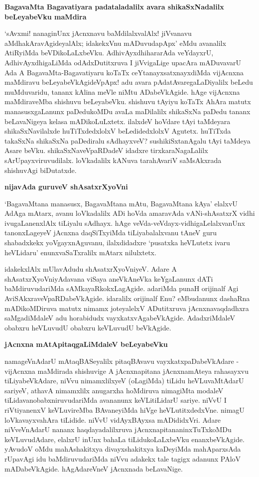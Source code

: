 {\bigskip
\noindent
{\large\bf BagavaMta Bagavatiyara padataladalilx avara shikaSxNadalilx beLeyabeVku maMdira}}\label{page67}
\medskip

\noindent
`sAvxmi! nanaginUnx jAcnxnavu baMdilalxvalAlx! jiVvanavu aMdhakAravAgideyalAlx; idakekxVnu mADuvu\-dapApx' eMdu avanalilx AtiRyiMda beVDikoLaLxbeVku. AdhivAyxdhihararAda veYdayxrU, AdhivAyxdhi\-gaLiMda odAdxDu\-titxruva I jiVvigaLige upacAra mADuvavarU Ada A BagavaMta-Bagavatiyaru koTaTx ceYtanayx\-satxnayxdiMda vijAcnxna maMdiravu beLeyabeVkAgideVpApx! adu avara pAdatAvaregaLaDiyalilx beLedu muMdu\-varidu, tananx kAlina meVle niMtu ADabeVkAgide. hAge vijAcnxna maMdiraveMba shishuvu beLeyabeVku. shishuvu tAyiyu koTaTx AhAra matutx manasusxgaLanunx paDedukoMDu avaLa maDilalilx shikaSxNa paDedu tananx beLa\-vaNigeya kelasa mADikoLuLxtetx. ilalxdeV hoVdare tAyi taMdeyara shikaSxNavilalxde huTiTxdedxlolxV beLedi\-dedxlolxV Agutetx. huTiTxda takaSxNa shikaSxNa paDediralu sAdhayxveV? sushikiSxtanAgalu tAyi taMdeya Asare beVku. shikaSxNaveVpaRDadeV idadxre tirxkaraNagaLalilx sArUpayxviruvudilalx. loVkadalilx kANuva tarahAvariV saMsAkxrada shishuvAgi biDutatxde.

{\bigskip
\noindent
{\large\bf nijavAda guruveV shAsatxrXyoVni}}\label{page68}
\medskip

\noindent
`BagavaMtana manasusx, BagavaMtana mAtu, BagavaMtana kAya' elalxvU AdAga mAtarx, avanu loVka\-dalilx ADi hoVda amaravAda vANi-shAsatxrX vidhi ivugaLanenxlAlx tiLi\-yalu sAdhayx. hAge veVda-veVdayx-vidhi\-gaLelalxvanUnx tanonxLageyeV jAcnxna daqSiTx\-yiMda tiLiyabalalxvanu tAneV guru shabadxkekx yoVgayxnAguvanu, ilalxdidadxre `pusatxka heVLutetx ivaru heVLidaru' enunxvaSaTxralilx mAtarx nilulxtetx.

idakekxlAlx mUlavAdudu shAsatxrXyoVniyeV. Adare A shAsatxrXyoVni\-yAdavana viSaya aneVkAneVka keYga\-Lanunx dATi baMdiruvudariMda sAMkayaRkokxLagAgide. adariMda punaH orijinalf Agi AviSAkxra\-veVpaRDabeVkAgide. idaralilx orijinalf Enu? eMbudanunx dashaRna mADikoMDiruva matutx nimamx joteyalelxV ADu\-titxruva jAcnxnavaqdadhxra saMgadiMdaleV adu horabidudx vayxkatxvAgabeVkAgide. Adadx\-riMdaleV obabxru heVLuvudU obabxru keVLuvudU beVkAgide.

{\bigskip
\noindent
{\large\bf jAcnxna mAtApitaqgaLiMdaleV beLeyabeVku}}\label{page79}
\medskip

\noindent
namageVnAdarU mAtaqBASeyalilx pitaqBAvavu vayxkatxpaDabeVkAdare - vijAcnxna maMdirada shishuvige A jAcnxna\-pitana jAcnxnamAteya rahasayxvu tiLiyabeVkAdare, niVvu nimamxlilxyeV (oLagiMda) tiLidu heVLu\-vaMtA\-darU sariyeV, athavA nimamxlilx anugarxha hoMdiruva nimagiMta modaleV tiLidavanobabxniruvudariMda avananunx keVLitiLidarU sariye. niVvU I riVtiyanenxV keVLuvireMba BAvaneyiMda hiVge heVLu\-titxdedxVne. nimagU loVkavayxvahAra tiLidide. niVvU vidAyxBAyxsa mADididxVri. Adare niVveVnAdarU nananx haqdaya\-dalilxruva jAcnxnapitananinxTuTxkoMDu keVLuvudAdare, elalxrU inUnx bahaLa tiLidukoLaLxbeVku enanxbeVkA\-gide. yAvudoV oMdu mahAshakitxya divayxshakitxya kaDeyiMda mahAparxsAda rUpavAgi idu baMdiru\-vudariMda niVvu adakekx tale tagigx adanunx PAloV mADabeVkAgide. hAgAdareVneV jAcnxnada beLavaNige.

